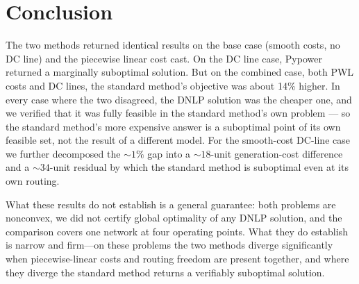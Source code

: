 \documentclass[11pt]{article}
\begin{document}
\section{Conclusion}

The two methods returned identical results on the base case (smooth costs, no DC line) and
the piecewise linear cost cast. On the DC line case, Pypower returned a marginally suboptimal 
solution. But on the combined case, both PWL costs and DC lines, the standard method's objective 
was about 14\% higher. In every
case where the two disagreed, the DNLP solution was the cheaper one, and we
verified that it was fully feasible in the standard method's own problem --- so
the standard method's more expensive answer is a suboptimal point of its own
feasible set, not the result of a different model. For the smooth-cost DC-line
case we further decomposed the ${\sim}1\%$ gap into a ${\sim}18$-unit
generation-cost difference and a ${\sim}34$-unit residual by which the standard
method is suboptimal even at its own routing.

What these results do not establish is a general guarantee: both problems are
nonconvex, we did not certify global optimality of any DNLP solution, and the
comparison covers one network at four operating points. What they do establish
is narrow and firm---on these problems the two methods diverge significantly when
piecewise-linear costs and routing freedom are present together, and where they
diverge the standard method returns a verifiably suboptimal solution.
\end{document}
